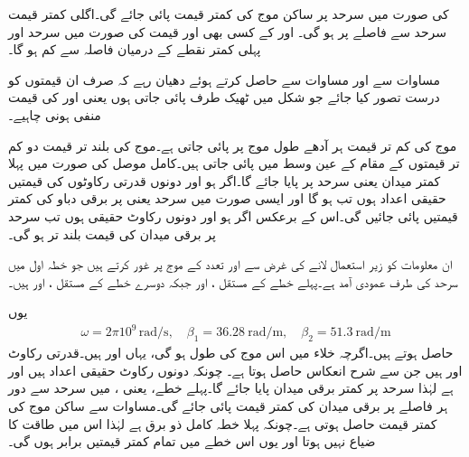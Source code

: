  کی صورت میں سرحد پر ساکن موج کی کمتر قیمت پائی جائے گی۔اگلی کمتر قیمت سرحد سے  فاصلے پر ہو گی۔ اور  کے کسی بھی اور قیمت کی صورت میں سرحد اور پہلی کمتر نقطے کے درمیان فاصلہ  سے کم ہو گا۔

مساوات  سے  اور مساوات  سے  حاصل کرتے ہوئے دھیان رہے کہ صرف ان قیمتوں کو درست تصور کیا جائے جو شکل  میں ٹھیک طرف پائی جاتی ہوں یعنی  اور   کی قیمت منفی ہونی چاہیے۔

موج کی کم تر قیمت ہر آدھے طول موج پر پائی جاتی ہے۔موج کی بلند تر قیمت دو کم تر قیمتوں کے مقام کے عین وسط میں پائی جاتی ہیں۔کامل موصل کی صورت میں پہلا کمتر میدان  یعنی سرحد پر پایا جائے گا۔اگر  ہو اور دونوں قدرتی رکاوٹوں کی قیمتیں حقیقی اعداد ہوں تب  ہو گا اور ایسی صورت میں سرحد یعنی  پر برقی دباو کی کمتر قیمتیں پائی جائیں گی۔اس کے برعکس اگر  ہو اور دونوں رکاوٹ حقیقی ہوں تب سرحد پر برقی میدان کی قیمت بلند تر ہو گی۔  

ان معلومات کو زیر استعمال لانے کی غرض سے  اور  تعدد کے موج پر غور کرتے ہیں جو خطہ اول میں سرحد کی طرف عمودی آمد ہے۔پہلے خطے کے مستقل ،  اور  جبکہ دوسرے خطے کے مستقل
 ،  اور  ہیں۔

یوں 
\begin{align*}
\omega=2 \pi 10^9 \, \si{\radian \per \second}, \quad \beta_1=\SI{36.28}{\radian \per \meter}, \quad \beta_2=\SI{51.3}{\radian \per \meter}
\end{align*}
حاصل ہوتے ہیں۔اگرچہ خلاء میں اس موج کی طول  ہو گی، یہاں   اور  ہیں۔قدرتی رکاوٹ  اور  ہیں جن سے شرح انعکاس  حاصل ہوتا ہے۔ چونکہ دونوں رکاوٹ حقیقی اعداد ہیں اور  ہے لہٰذا سرحد پر کمتر برقی میدان پایا جائے گا۔پہلے خطے، یعنی  ،  میں سرحد سے دور ہر  فاصلے پر برقی میدان کی کمتر قیمت پائی جائے گی۔مساوات  سے ساکن موج کی کمتر قیمت  حاصل ہوتی ہے۔چونکہ پہلا خطہ کامل ذو برق ہے لہٰذا اس میں طاقت کا ضیاع نہیں ہوتا اور یوں اس خطے میں تمام کمتر قیمتیں برابر ہوں گی۔

